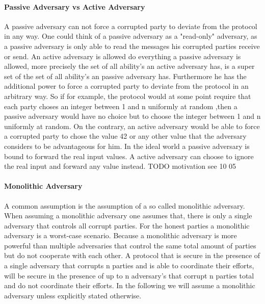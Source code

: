 \paragraph{Passive Adversary vs Active Adversary}
A passive adversary can not force a corrupted party to deviate from the protocol in any way. One could think of a passive adversary as a "read-only" adversary, as a passive adversary is only able to read the messages his corrupted parties receive or send. An active adversary is allowed do everything a passive adversary is allowed, more precisely the set of all ability's an active adversary has, is a super set of the set of all ability's an passive adversary has. Furthermore he has the additional power to force a corrupted party to deviate from the protocol in an arbitrary way. So if for example, the protocol would at some point require that each party choses an integer between 1 and n uniformly at random ,then a passive adversary would have no choice but to choose the integer between 1 and n uniformly at random. 
On the contrary, an active adversary would be able to force a corrupted party to chose the value 42 or any other value that the adversary considers to be advantageous for him. In the ideal world a passive adversary is bound to forward the real input values. A active adversary can choose to ignore the real input and forward any value instead.
TODO motivation see 10 05



\paragraph{Monolithic Adversary}
A common assumption is the assumption of a so called monolithic adversary. When assuming a monolithic adversary one assumes that, there is only a single adversary that controls all corrupt parties. For the honest parties a monolithic adversary is a worst-case scenario. Because a monolithic adversary is more powerful than multiple adversaries that control the same total amount of parties but do not cooperate with each other. A protocol that is secure in the presence of a single adversary that corrupts n parties and is able to coordinate their efforts, will be secure in the presence of up to n adversary's that corrupt n parties total and do not coordinate their efforts. In the following we will assume a monolithic adversary unless explicitly stated otherwise.
